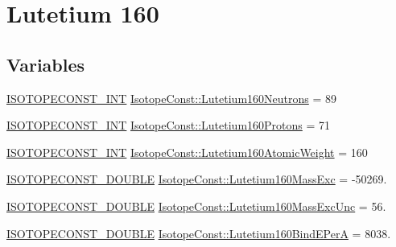 \hypertarget{group___isotope_const-_lutetium-_lu160}{}\section{Lutetium 160}
\label{group___isotope_const-_lutetium-_lu160}
\subsection*{Variables}
\begin{DoxyCompactItemize}
\item 
\mbox{\hyperlink{group___isotope_const-_macros_ga5f18360b3e99483a35c32d789e62621c}{I\+S\+O\+T\+O\+P\+E\+C\+O\+N\+S\+T\+\_\+\+I\+NT}} \mbox{\hyperlink{group___isotope_const-_lutetium-_lu160_ga11c4e8482b3df0c848d8d344461130d1}{Isotope\+Const\+::\+Lutetium160\+Neutrons}} = 89
\item 
\mbox{\hyperlink{group___isotope_const-_macros_ga5f18360b3e99483a35c32d789e62621c}{I\+S\+O\+T\+O\+P\+E\+C\+O\+N\+S\+T\+\_\+\+I\+NT}} \mbox{\hyperlink{group___isotope_const-_lutetium-_lu160_ga33a0db0c80aa9b34fc4c81ed956a0b57}{Isotope\+Const\+::\+Lutetium160\+Protons}} = 71
\item 
\mbox{\hyperlink{group___isotope_const-_macros_ga5f18360b3e99483a35c32d789e62621c}{I\+S\+O\+T\+O\+P\+E\+C\+O\+N\+S\+T\+\_\+\+I\+NT}} \mbox{\hyperlink{group___isotope_const-_lutetium-_lu160_gaa7d2b8a00cbaeb192b4cdd9d2544e7bf}{Isotope\+Const\+::\+Lutetium160\+Atomic\+Weight}} = 160
\item 
\mbox{\hyperlink{group___isotope_const-_macros_ga8f45a7272ce02c0b4c65c44636ed719a}{I\+S\+O\+T\+O\+P\+E\+C\+O\+N\+S\+T\+\_\+\+D\+O\+U\+B\+LE}} \mbox{\hyperlink{group___isotope_const-_lutetium-_lu160_ga8deec663428a192e2063a75ce62fd606}{Isotope\+Const\+::\+Lutetium160\+Mass\+Exc}} = -\/50269.
\item 
\mbox{\hyperlink{group___isotope_const-_macros_ga8f45a7272ce02c0b4c65c44636ed719a}{I\+S\+O\+T\+O\+P\+E\+C\+O\+N\+S\+T\+\_\+\+D\+O\+U\+B\+LE}} \mbox{\hyperlink{group___isotope_const-_lutetium-_lu160_ga45547fe3ad0a6d192443265dcf6fecff}{Isotope\+Const\+::\+Lutetium160\+Mass\+Exc\+Unc}} = 56.
\item 
\mbox{\hyperlink{group___isotope_const-_macros_ga8f45a7272ce02c0b4c65c44636ed719a}{I\+S\+O\+T\+O\+P\+E\+C\+O\+N\+S\+T\+\_\+\+D\+O\+U\+B\+LE}} \mbox{\hyperlink{group___isotope_const-_lutetium-_lu160_ga71cce444b627ddb83a2eaab56db5a7df}{Isotope\+Const\+::\+Lutetium160\+Bind\+E\+PerA}} = 8038.
\item 

\end{DoxyCompactItemize}
